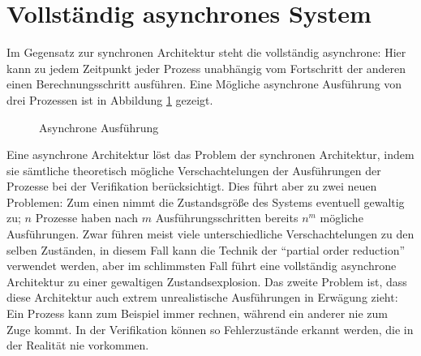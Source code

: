 \section{Vollständig asynchrones System}
Im Gegensatz zur synchronen Architektur steht die vollständig asynchrone: 
Hier kann zu jedem Zeitpunkt jeder Prozess unabhängig vom Fortschritt der anderen einen Berechnungsschritt ausführen.
Eine Mögliche asynchrone Ausführung von drei Prozessen ist in Abbildung \ref{fig:asynchronous_execution} gezeigt.
\begin{figure}[h]
  \centering
  \caption{Asynchrone Ausführung}
  \label{fig:asynchronous_execution}
\end{figure}

Eine asynchrone Architektur löst das Problem der synchronen Architektur, indem sie sämtliche theoretisch mögliche Verschachtelungen der Ausführungen der Prozesse bei der Verifikation berücksichtigt.
Dies führt aber zu zwei neuen Problemen:
Zum einen nimmt die Zustandsgröße des Systems eventuell gewaltig zu; $n$ Prozesse haben nach $m$ Ausführungsschritten bereits $n^m$ mögliche Ausführungen.
Zwar führen meist viele unterschiedliche Verschachtelungen zu den selben Zuständen, in diesem Fall kann die Technik der "`partial order reduction"'\cite{partial_order_reduction} verwendet werden, aber im schlimmsten Fall führt eine vollständig asynchrone Architektur zu einer gewaltigen Zustandsexplosion.
Das zweite Problem ist, dass diese Architektur auch extrem unrealistische Ausführungen in Erwägung zieht:
Ein Prozess kann zum Beispiel immer rechnen, während ein anderer nie zum Zuge kommt.
In der Verifikation können so Fehlerzustände erkannt werden, die in der Realität nie vorkommen.


